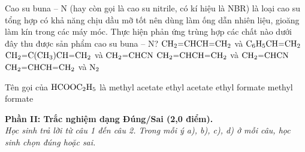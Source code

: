 \documentclass[11pt,a4paper]{article}
\begin{document}
\begin{ex}
Cao su buna -- N (hay còn gọi là cao su nitrile, có kí hiệu là NBR) là loại cao su tổng hợp có khả năng chịu dầu mỡ tốt nên dùng làm ống dẫn nhiên liệu, gioăng làm kín trong các máy móc. Thực hiện phản ứng trùng hợp các chất nào dưới đây thu được sản phẩm cao su buna -- N?
\choice
{$\ce{CH2=CHCH=CH2}$ và $\ce{C6H5CH=CH2}$}
{$\ce{CH2=C(CH3)CH=CH2}$ và $\ce{CH2=CHCN}$}
{\True $\ce{CH2=CHCH=CH2}$ và $\ce{CH2=CHCN}$}
{$\ce{CH2=CHCH=CH2}$ và $\ce{N2}$}

\end{ex}
\begin{ex}
Tên gọi của $\ce{HCOOC2H5}$ là
\choice
{methyl acetate}
{ethyl acetate}
{\True ethyl formate}
{methyl formate}

\end{ex}
\vspace{4pt}
\noindent
{\color{mainGreen}\textbf{\large Phần II: Trắc nghiệm dạng Đúng/Sai (2,0 điểm).}}\\
\textit{\small Học sinh trả lời từ câu 1 đến câu 2. Trong mỗi ý a), b), c), d) ở mỗi câu, học sinh chọn đúng hoặc sai.}
\vspace{2pt}
\end{document}
